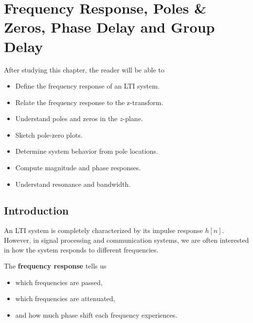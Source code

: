 
\chapter{Frequency Response, Poles \& Zeros, Phase Delay and Group Delay}

\begin{tcolorbox}[colback=blue!5!white,colframe=blue!70!black,title=Learning Objectives]

After studying this chapter, the reader will be able to

\begin{itemize}
\item Define the frequency response of an LTI system.
\item Relate the frequency response to the z-transform.
\item Understand poles and zeros in the \(z\)-plane.
\item Sketch pole-zero plots.
\item Determine system behavior from pole locations.
\item Compute magnitude and phase responses.
\item Understand resonance and bandwidth.
\end{itemize}

\end{tcolorbox}


\section{Introduction}

An LTI system is completely characterized by its impulse response \(h[n]\).
However, in signal processing and communication systems, we are often interested
in how the system responds to different frequencies.

The \textbf{frequency response} tells us

\begin{itemize}
\item which frequencies are passed,
\item which frequencies are attenuated,
\item and how much phase shift each frequency experiences.
\end{itemize}

